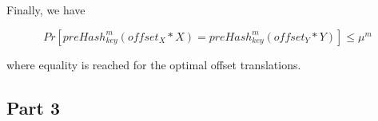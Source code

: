 Finally, we have

\begin{equation}
    Pr[preHash_{key}^m(offset_X * X) = preHash_{key}^m(offset_Y * Y)] \leq \mu^m
\end{equation}

where equality is reached for the optimal offset translations.

\subsection{Part 3}